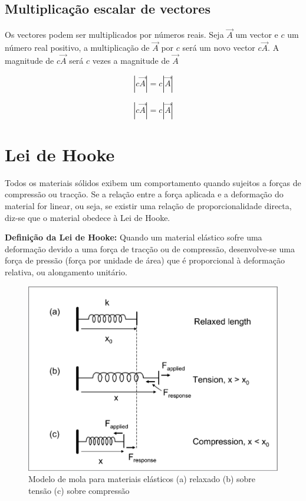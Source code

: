 \documentclass[
  portuguese,
  ]{book}
\begin{document}
\hypertarget{multiplicauxe7uxe3o-escalar-de-vectores}{%
\section{Multiplicação escalar de vectores}\label{multiplicauxe7uxe3o-escalar-de-vectores}}

Os vectores podem ser multiplicados por números reais. Seja \(\vec{A}\) um vector e \(c\) um número real positivo, a multiplicação de \(\vec{A}\) por \(c\) será um novo vector \(c\vec{A}\). A magnitude de \(c\vec{A}\) será \(c\) vezes a magnitude de \(\vec{A}\)

\[|c\vec{A}|=c|\vec{A}|\]

\begin{equation}
|c\vec{A}|=c|\vec{A}|
\label{eq:escvec}
\end{equation}

\hypertarget{lei-de-hooke}{%
\chapter{Lei de Hooke}\label{lei-de-hooke}}

Todos os materiais sólidos exibem um comportamento quando sujeitos a forças de compressão ou tracção. Se a relação entre a força aplicada e a deformação do material for linear, ou seja, se existir uma relação de proporcionalidade directa, diz-se que o material obedece à Lei de Hooke.

\textbf{Definição da Lei de Hooke:} Quando um material elástico sofre uma deformação devido a uma força de tracção ou de compressão, desenvolve-se uma força de pressão (força por unidade de área) que é proporcional à deformação relativa, ou alongamento unitário.

\begin{figure}

{\centering \includegraphics[width=0.5\linewidth]{img/lei_de_hooke_1} 

}

\caption{Modelo de mola para materiais elásticos (a) relaxado (b) sobre tensão (c) sobre compressão}\label{fig:img61}
\end{figure}
\end{document}
